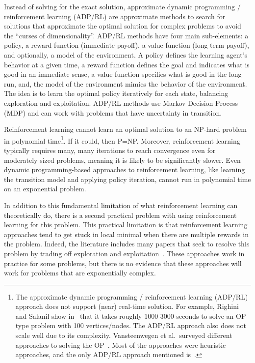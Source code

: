 Instead of solving for the exact solution, approximate dynamic programming / reinforcement learning (ADP/RL) are approximate methods to search for solutions that approximate the optimal solution for complex problems to avoid the ``curses of dimensionality''. ADP/RL methods have four main sub-elements: a policy, a reward function (immediate payoff), a value function (long-term payoff), and optionally, a model of the environment. A policy defines the learning agent's behavior at a given time, a reward function defines the goal and indicates what is good in an immediate sense, a value function specifies what is good in the long run, and, the model of the environment mimics the behavior of the environment. The idea is to learn the optimal policy iteratively for each state, balancing exploration and exploitation. ADP/RL methods use Markov Decision Process (MDP) and can work with problems that have uncertainty in transition.

Reinforcement learning cannot learn an optimal solution to an NP-hard problem in polynomial time\footnote{The approximate dynamic programming / reinforcement learning (ADP/RL) approach does not support (near) real-time solution. For example, Righini and Salanil show in~\cite{Righini2009Decremental} that it takes roughly 1000-3000 seconds to solve an OP type problem with 100 vertices/nodes. The ADP/RL approach also does not scale well due to its complexity. Vansteenwegen et al.\ surveyed different approaches to solving the OP~\cite{Vansteenwegen2011Orienteering}. Most of the approaches were heuristic approaches, and the only ADP/RL approach mentioned is~\cite{Righini2009Decremental}.}. If it could, then P=NP. Moreover, reinforcement learning typically requires many, many iterations to reach convergence even for moderately sized problems, meaning it is likely to be significantly slower.  Even dynamic programming-based approaches to reinforcement learning, like learning the transition model and applying policy iteration, cannot run in polynomial time on an exponential problem.

In addition to this fundamental limitation of what reinforcement learning can theoretically do, there is a second practical problem with using reinforcement learning for this problem. This practical limitation is that reinforcement learning approaches tend to get stuck in local minimal when there are multiple rewards in the problem.  Indeed, the literature includes many papers that seek to resolve this problem by trading off exploration and exploitation~\cite{Sutton1998Reinforcement}.  These approaches work in practice for some problems, but there is no evidence that these approaches will work for problems that are exponentially complex.  

